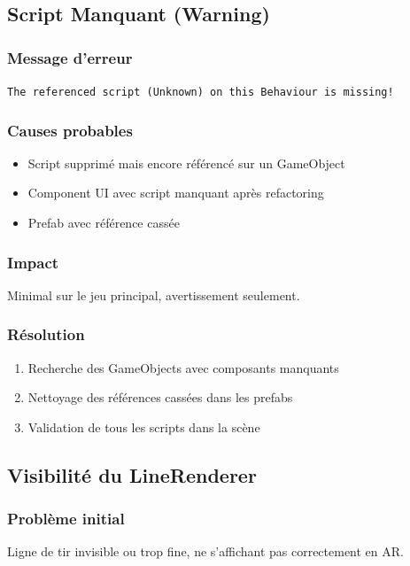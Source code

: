 \documentclass[12pt,a4paper]{article}
\begin{document}
\subsection{Script Manquant (Warning)}

\subsubsection{Message d'erreur}
\texttt{The referenced script (Unknown) on this Behaviour is missing!}

\subsubsection{Causes probables}
\begin{itemize}
    \item Script supprimé mais encore référencé sur un GameObject
    \item Component UI avec script manquant après refactoring
    \item Prefab avec référence cassée
\end{itemize}

\subsubsection{Impact}
Minimal sur le jeu principal, avertissement seulement.

\subsubsection{Résolution}
\begin{enumerate}
    \item Recherche des GameObjects avec composants manquants
    \item Nettoyage des références cassées dans les prefabs
    \item Validation de tous les scripts dans la scène
\end{enumerate}

\subsection{Visibilité du LineRenderer}

\subsubsection{Problème initial}
Ligne de tir invisible ou trop fine, ne s'affichant pas correctement en AR.
\end{document}
